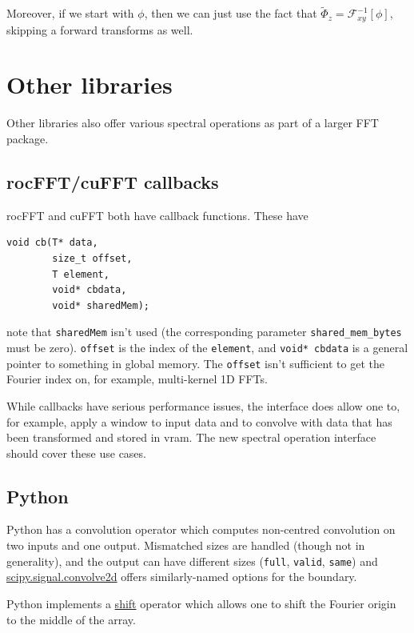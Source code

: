 \documentclass[12pt]{article}
\renewcommand{\(}{\left(}
\renewcommand{\)}{\right)}
\begin{document}
Moreover, if we start with $\phi$, then we can just use the fact that
$\tilde\Phi_z=\mathcal{F}^{-1}_{xy}\left[\phi\right]$, skipping a
forward transforms as well.


\section{Other libraries}

Other libraries also offer various spectral operations as part of a larger
FFT package.

\subsection{rocFFT/cuFFT callbacks}

rocFFT and cuFFT both have callback functions.  These have
\begin{lstlisting}
void cb(T* data,
        size_t offset,
        T element,
        void* cbdata,
        void* sharedMem);
\end{lstlisting}
note that \lstinline{sharedMem} isn't used (the corresponding
parameter \lstinline{shared_mem_bytes} must be zero).
\lstinline{offset} is the index of the \lstinline{element}, and
\lstinline{void* cbdata} is a general pointer to something in global
memory.  The \lstinline{offset} isn't sufficient to get the Fourier
index on, for example, multi-kernel 1D FFTs.

While callbacks have serious performance issues, the interface does
allow one to, for example, apply a window to input data and to
convolve with data that has been transformed and stored in vram.  The
new spectral operation interface should cover these use cases.

\subsection{Python}

Python has a convolution operator which computes non-centred
convolution on two inputs and one output.  Mismatched sizes are
handled (though not in generality), and the output can have different
sizes (\texttt{full}, \texttt{valid}, \texttt{same}) and
\href{https://docs.scipy.org/doc/scipy/reference/generated/scipy.signal.convolve2d.html}{scipy.signal.convolve2d}
offers similarly-named options for the boundary.

Python implements a
\href{https://numpy.org/doc/stable/reference/generated/numpy.fft.fftshift.html}{shift}
operator which allows one to shift the Fourier origin to the middle of
the array.
\end{document}
